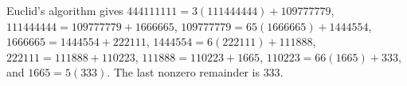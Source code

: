 Euclid's algorithm gives $444111111=3(111444444)+109777779$, $111444444=109777779+1666665$, $109777779=65(1666665)+1444554$, $1666665=1444554+222111$, $1444554=6(222111)+111888$, $222111=111888+110223$, $111888=110223+1665$, $110223=66(1665)+333$, and $1665=5(333)$. The last nonzero remainder is $\boxed{333}$.
